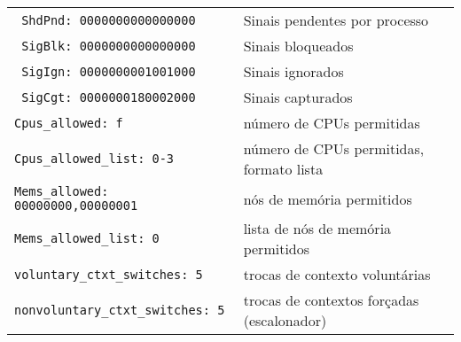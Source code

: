 \begin{tabular}{ll}
\tt\color{gray} ShdPnd: 0000000000000000&\color{gray} \footnotesize Sinais pendentes por processo\\
\tt\color{gray} SigBlk: 0000000000000000&\color{gray} \footnotesize Sinais bloqueados\\
\tt\color{gray} SigIgn: 0000000001001000&\color{gray} \footnotesize Sinais ignorados\\
\tt\color{gray} SigCgt: 0000000180002000&\color{gray} \footnotesize Sinais capturados\\
\tt Cpus\_allowed:   f& \footnotesize número de CPUs permitidas\\
\tt Cpus\_allowed\_list:      0-3&\footnotesize número de CPUs permitidas, formato lista\\
\tt Mems\_allowed:   00000000,00000001& \footnotesize nós de memória permitidos\\
\tt Mems\_allowed\_list:      0&\footnotesize lista de nós de memória permitidos\\
\tt voluntary\_ctxt\_switches:        5& \footnotesize trocas de contexto voluntárias\\
\tt nonvoluntary\_ctxt\_switches:     5& \footnotesize trocas de contextos
forçadas (escalonador)\\
\end{tabular}

